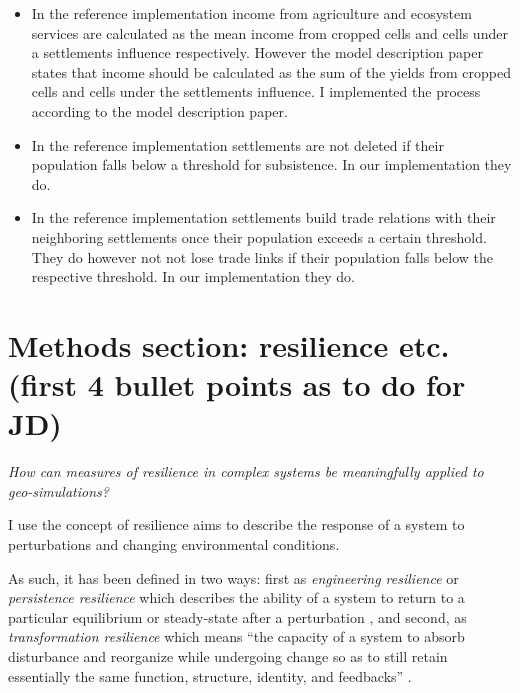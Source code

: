 \begin{itemize}
    \item In the reference implementation income from agriculture and ecosystem services are calculated as the mean income from cropped cells and cells under a settlements influence respectively. However the model description paper states that income should be calculated as the sum of the yields from cropped cells and cells under the settlements influence. I implemented the process according to the model description paper.
    \item In the reference implementation settlements are not deleted if their population falls below a threshold for subsistence. In our implementation they do.
    \item In the reference implementation settlements build trade relations with their neighboring settlements once their population exceeds a certain threshold. They do however not not lose trade links if their population falls below the respective threshold. In our implementation they do.
\end{itemize}

\section{Methods section: resilience etc. \textbf{(first 4 bullet points as to do for JD)}}
\textit{How can measures of resilience in complex systems be meaningfully applied to geo-simulations?}

I use the concept of resilience \citep{Holling1973} aims to describe the response of a system to perturbations and changing environmental conditions. 


As such, it has been defined in two ways: 
first as \emph{engineering resilience} or \emph{persistence resilience} which describes the ability of a system to return to a particular equilibrium or steady-state after a perturbation \citep{Holling1973, Gunderson2000}, and
second, as \emph{transformation resilience} which means ``the capacity of a system to absorb disturbance and reorganize while undergoing change so as to still retain essentially the same function, structure, identity, and feedbacks'' \citep{Walker2004}.


